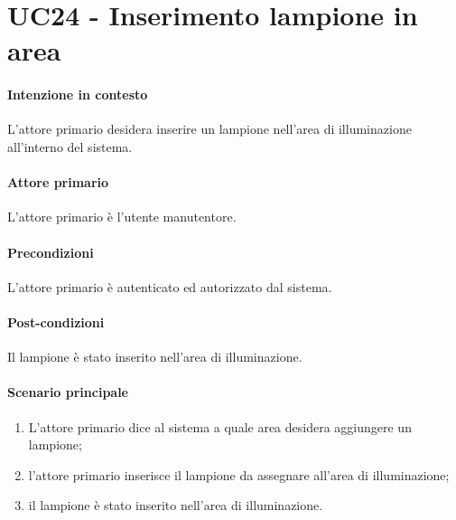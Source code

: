 \section{UC24 - Inserimento lampione in area}\label{uc:24}
\paragraph{Intenzione in contesto} L'attore primario desidera inserire un lampione nell'area di illuminazione all'interno del sistema.
\paragraph{Attore primario} L'attore primario è l'utente manutentore.
\paragraph{Precondizioni}  L'attore primario è autenticato ed autorizzato dal sistema.
\paragraph{Post-condizioni} Il lampione è stato inserito nell'area di illuminazione.
\paragraph{Scenario principale}
\begin{enumerate}
    \item L'attore primario dice al sistema a quale area desidera aggiungere un lampione;
    \item l'attore primario inserisce il lampione da assegnare all'area di illuminazione;
    \item il lampione è stato inserito nell'area di illuminazione.
\end{enumerate}